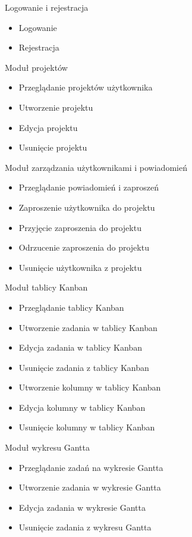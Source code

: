 \item Logowanie i rejestracja
\begin{itemize}
    \item Logowanie
    \item Rejestracja
\end{itemize}

\item Moduł projektów
\begin{itemize}
    \item Przeglądanie projektów użytkownika
    \item Utworzenie projektu
    \item Edycja projektu
    \item Usunięcie projektu
\end{itemize}

\item Moduł zarządzania użytkownikami i powiadomień
\begin{itemize}
    \item Przeglądanie powiadomień i zaproszeń
    \item Zaproszenie użytkownika do projektu
    \item Przyjęcie zaproszenia do projektu
    \item Odrzucenie zaproszenia do projektu
    \item Usunięcie użytkownika z projektu
    
\end{itemize}

\item Moduł tablicy Kanban
\begin{itemize}
    \item Przeglądanie tablicy Kanban
    \item Utworzenie zadania w tablicy Kanban
    \item Edycja zadania w tablicy Kanban
    \item Usunięcie zadania z tablicy Kanban
    \item Utworzenie kolumny w tablicy Kanban
    \item Edycja kolumny w tablicy Kanban
    \item Usunięcie kolumny w tablicy Kanban
    
\end{itemize}

\item Moduł wykresu Gantta
\begin{itemize}
    \item Przeglądanie zadań na wykresie Gantta
    \item Utworzenie zadania w wykresie Gantta
    \item Edycja zadania w wykresie Gantta
    \item Usunięcie zadania z wykresu Gantta
    
\end{itemize}

